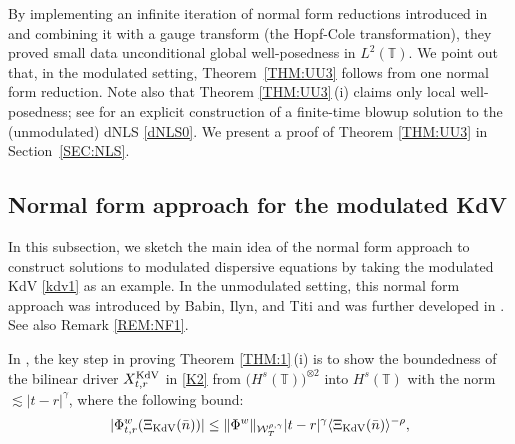 \documentclass[letterpaper, 11pt,  reqno]{amsart}
\newcommand{\1}{\hspace{0.5mm}\text{I}\hspace{0.5mm}}
\newcommand{\noi}{\noindent}
\newcommand{\T}{\mathbb{T}}
\newcommand{\g}{\gamma}
\newcommand{\les}{\lesssim}
\newcommand{\jb}[1]
{\langle #1 \rangle}
\newcommand{\W}{\mathcal{W}}
\newcommand{\KDV}{\text{\rm KdV} }
\numberwithin{equation}{section}
\numberwithin{theorem}{section}
\begin{document}
\noi
By implementing an infinite iteration
of normal form reductions introduced in \cite{GKO}
and combining it with a gauge transform
(the Hopf-Cole transformation), 
they proved
small data unconditional global well-posedness in $L^2(\T)$.
We point out that, in the modulated setting, 
 Theorem~\ref{THM:UU3}
follows from one normal form reduction.
Note also that 
 Theorem \ref{THM:UU3}\,(i)
claims only local well-posedness;
see \cite[Appendix A]{CGKO}
for an explicit construction of
a finite-time blowup solution
to the (unmodulated) dNLS \eqref{dNLS0}.
We present 
 a proof of Theorem \ref{THM:UU3}
in  Section~\ref{SEC:NLS}.














\subsection{Normal form approach
for the modulated KdV}
\label{SUBSEC:NF}


In this subsection, we sketch the main idea
of the normal form approach to construct solutions
to modulated dispersive equations
by taking the modulated KdV \eqref{kdv1} as an example.
In the unmodulated setting, 
this normal form approach was introduced  by Babin, Ilyn, and Titi \cite{BIT}
and was further developed in \cite{KO, GKO, OW, Ki2}.
See also Remark \ref{REM:NF1}.




In \cite{CGLLO1}, 
the key step  in proving Theorem \ref{THM:1}\,(i)
is to show the boundedness
of the bilinear driver 
$X^\KDV_{t,r}$ in \eqref{K2}
from 
 $\big(H^s(\T)\big)^{\otimes 2}$ into $H^s(\T)$
with the norm $\les |t-r|^\g$, 
where the following bound:
\begin{align}
| \Phi^w_{t,r}(\Xi_\KDV (\bar n))|
\le
\|\Phi^w\|_{  \W^{\rho,\g}_T} |t - r|^\g \jb{\Xi_\KDV (\bar n)}^{-\rho}, 
\label{decay1}
\end{align}
\end{document}
